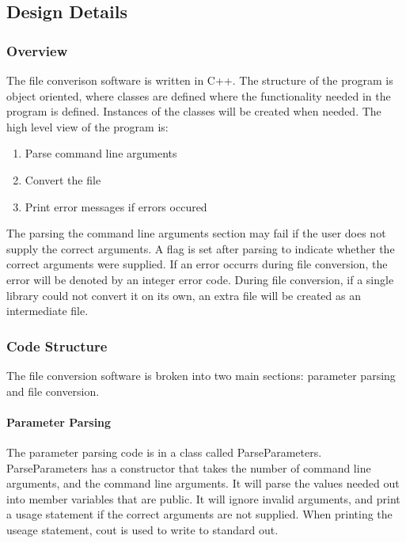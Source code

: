     \subsection{Design Details}

    \subsubsection{Overview}

    The file converison software is written in C++.  The structure of the program is object oriented, where classes are defined where the functionality needed
    in the program is defined.  Instances of the classes will be created when needed.  
    The high level view of the program is:
    \begin{enumerate}
        \item Parse command line arguments
        \item Convert the file
        \item Print error messages if errors occured
    \end{enumerate}

    The parsing the command line arguments section may fail if the user does not supply the correct arguments.  A flag is set after parsing to indicate
    whether the correct arguments were supplied.  If an error occurrs during file conversion, the error will be denoted by an integer error code.  
    During file conversion, if a single library could not convert it on its own, an extra file will be created as an intermediate file.

    \subsubsection{Code Structure}
    The file conversion software is broken into two main sections: parameter parsing and file conversion.

    \paragraph{Parameter Parsing}
    \hfill \break
    The parameter parsing code is in a class called ParseParameters.  ParseParameters has a constructor that takes the number of command line arguments, 
    and the command line arguments.  It will parse the values needed out into member variables that are public.  It will ignore invalid arguments,
    and print a usage statement if the correct arguments are not supplied.  When printing the useage statement, cout is used to write to standard out.

